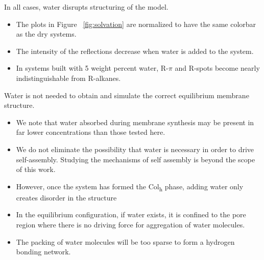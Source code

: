 \documentclass{article}
\begin{document}
  In all cases, water disrupts structuring of the model.
  \begin{itemize}
	\item The plots in Figure ~\ref{fig:solvation} are normalized 
	to have the same colorbar as the dry systems. 
	\item The intensity of the reflections decrease when water is 
	added to the system.
	\item In systems built with 5 weight percent water, R-$\pi$ and
	R-spots become nearly indistinguishable from R-alkanes.
  \end{itemize}

  Water is not needed to obtain and simulate the correct equilibrium 
  membrane structure.
  \begin{itemize}
	\item We note that water absorbed during membrane synthesis may
        be present in far lower concentrations than those 
        tested here.
	\item We do not eliminate the possibility that water is necessary
        in order to drive self-assembly. Studying the mechanisms of self assembly is
	beyond the scope of this work.
	\item However, once the system has formed the Col\textsubscript{h} 
	phase, adding water only creates disorder in the structure
	\item In the equilibrium configuration, if water exists, it is confined
	to the pore region where there is no driving force for aggregation of 
	water molecules. 
	\item The packing of water molecules will be too sparse to form a 
	hydrogen bonding network.
  \end{itemize}


 
\end{document}
